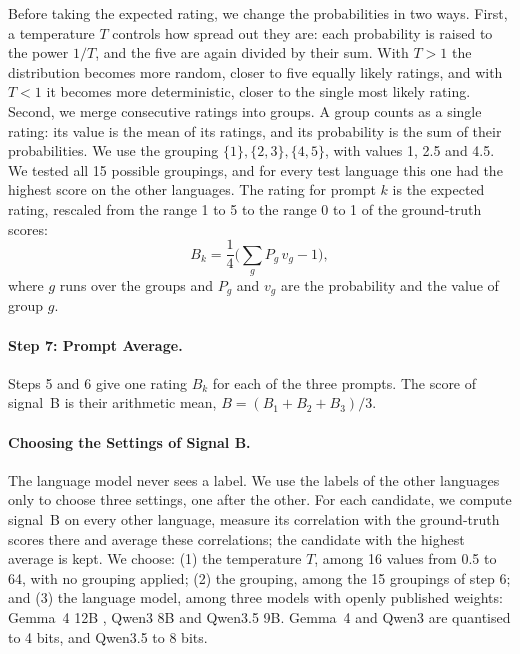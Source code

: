 Before taking the expected rating, we change the probabilities in two ways. First, a temperature
$T$ controls how spread out they are: each probability is raised to the power $1/T$, and the five %
are again divided by their sum. With $T > 1$ the distribution becomes more random, closer to five
equally likely ratings, and with $T < 1$ it becomes more deterministic, closer to the single most
likely rating. Second, we merge consecutive ratings into groups. A group counts as a single %
rating: its value is the mean of its ratings, and its probability is the sum of their
probabilities. We use the grouping $\{1\}, \{2, 3\}, \{4, 5\}$, with values 1, 2.5 and 4.5. We %
tested all 15 possible groupings, and for every test language this one had the highest score on %
the other languages. The rating for prompt $k$ is the expected rating, rescaled from the
range 1 to 5 to the range 0 to 1 of the ground-truth scores:
\begin{equation}
B_k = \frac{1}{4}\Big(\sum_{g} P_g\, v_g - 1\Big),
\label{eq:rating}
\end{equation}
where $g$ runs over the groups and $P_g$ and $v_g$ are the probability and the value of group $g$. %

\paragraph{Step 7: Prompt Average.} Steps 5 and 6 give one rating $B_k$ for each of the three %
prompts. The score of signal~B is their arithmetic mean, $B = (B_1 + B_2 + B_3)/3$.

\paragraph{Choosing the Settings of Signal B.} The language model never sees a label. We use the %
labels of the other languages only to choose three settings, one after the other. For each
candidate, we compute signal~B on every other language, measure its correlation with the
ground-truth scores there and average these correlations; the candidate with the highest average is kept. We
choose: (1) the temperature $T$, among 16 values from 0.5 to 64, with no grouping applied; (2) the grouping, %
among the 15 groupings of step 6; and (3) %
 the language model, among three models with openly published %
weights: Gemma~4 12B \citep{gemmateam-2026-gemma4}, Qwen3 8B \citep{yang-etal-2025-qwen3} and %
Qwen3.5 9B. Gemma~4 and Qwen3 are quantised to 4 bits, and Qwen3.5 to 8 bits. %

